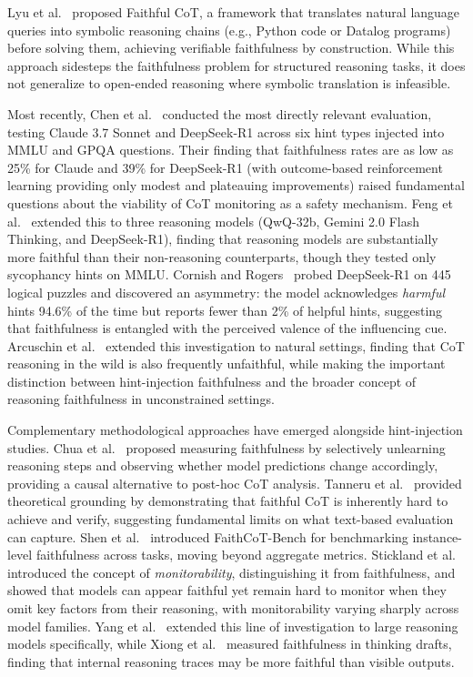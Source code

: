 Lyu et al.~\cite{lyu2023faithful} proposed Faithful CoT, a framework that translates
natural language queries into symbolic reasoning chains (e.g., Python code or
Datalog programs) before solving them, achieving verifiable faithfulness by
construction. While this approach sidesteps the faithfulness problem for structured
reasoning tasks, it does not generalize to open-ended reasoning where symbolic
translation is infeasible.

Most recently, Chen et al.~\cite{chen2025reasoning} conducted the most directly
relevant evaluation, testing Claude 3.7 Sonnet and DeepSeek-R1 across six hint
types injected into MMLU and GPQA questions. Their finding that faithfulness rates
are as low as 25\% for Claude and 39\% for DeepSeek-R1 (with outcome-based
reinforcement learning providing only modest and plateauing improvements) raised
fundamental questions about the viability of CoT monitoring as a safety mechanism.
Feng et al.~\cite{feng2025more} extended this to three reasoning models
(QwQ-32b, Gemini 2.0 Flash Thinking, and DeepSeek-R1), finding that reasoning
models are substantially more faithful than their non-reasoning counterparts,
though they tested only sycophancy hints on MMLU. Cornish and
Rogers~\cite{cornish2025examining} probed DeepSeek-R1 on 445 logical puzzles
and discovered an asymmetry: the model acknowledges \emph{harmful} hints
94.6\% of the time but reports fewer than 2\% of helpful hints, suggesting
that faithfulness is entangled with the perceived valence of the influencing cue.
Arcuschin et al.~\cite{arcuschin2025wild} extended this investigation to natural
settings, finding that CoT reasoning in the wild is also frequently unfaithful,
while making the important distinction between hint-injection faithfulness and the
broader concept of reasoning faithfulness in unconstrained settings.

Complementary methodological approaches have emerged alongside hint-injection
studies. Chua et al.~\cite{chua2025unlearning} proposed measuring faithfulness
by selectively unlearning reasoning steps and observing whether model predictions
change accordingly, providing a causal alternative to post-hoc CoT analysis.
Tanneru et al.~\cite{tanneru2024hardness} provided theoretical grounding by demonstrating that faithful CoT is inherently hard to achieve and verify, suggesting fundamental limits on what text-based evaluation can capture.
Shen et al.~\cite{shen2025faithcotbench} introduced FaithCoT-Bench for benchmarking instance-level faithfulness across tasks, moving beyond aggregate metrics.
Stickland et al.~\cite{stickland2025monitorability} introduced the concept of
\emph{monitorability}, distinguishing it from faithfulness, and showed that
models can appear faithful yet remain hard to monitor when they omit key factors
from their reasoning, with monitorability varying sharply across model families.
Yang et al.~\cite{yang2025monitorability} extended this line of investigation to large reasoning models specifically, while Xiong et al.~\cite{xiong2025thinking} measured faithfulness in thinking drafts, finding that internal reasoning traces may be more faithful than visible outputs.

